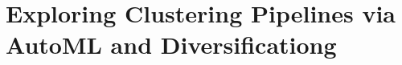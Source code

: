 
\chapter{Exploring Clustering Pipelines via AutoML and Diversificationg}
\label{data-centric-chap:unsupervised}